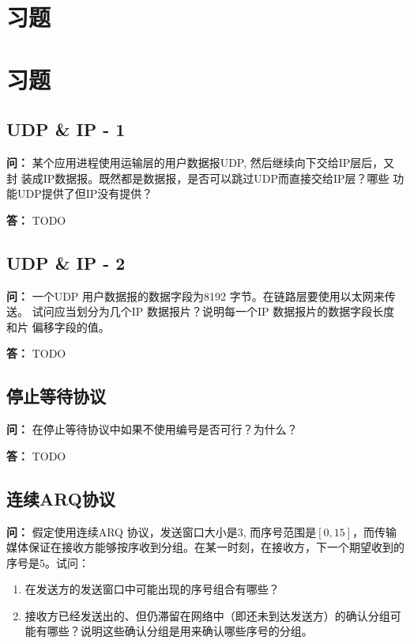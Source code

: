 \documentclass[12pt,hyperref,a4paper,UTF8]{ctexart}
\begin{document}
\cover
\thispagestyle{empty}%


\newpage
\tableofcontents

\newpage
\section{习题}

\section{习题}

\subsection{UDP \& IP - 1}
\textbf{问：}
某个应用进程使用运输层的用户数据报UDP, 然后继续向下交给IP层后，又封
装成IP数据报。既然都是数据报，是否可以跳过UDP而直接交给IP层？哪些
功能UDP提供了但IP没有提供？

\textbf{答：}
TODO

\subsection{UDP \& IP - 2}
\textbf{问：}
一个UDP 用户数据报的数据字段为8192 字节。在链路层要使用以太网来传送。
试问应当划分为几个IP 数据报片？说明每一个IP 数据报片的数据字段长度和片
偏移字段的值。

\textbf{答：}
TODO

\subsection{停止等待协议}
\textbf{问：}
在停止等待协议中如果不使用编号是否可行？为什么？

\textbf{答：}
TODO

\subsection{连续ARQ协议}
\textbf{问：}
假定使用连续ARQ 协议，发送窗口大小是$3$, 而序号范围是$[0, 15]$，而传输媒体保证在接收方能够按序收到分组。在某一时刻，在接收方，下一个期望收到的
序号是$5$。试问：
\begin{enumerate}[label=\Roman*),leftmargin=2.2\parindent]
    \item 在发送方的发送窗口中可能出现的序号组合有哪些？
    \item 接收方已经发送出的、但仍滞留在网络中（即还未到达发送方）的确认分组可能有哪些？说明这些确认分组是用来确认哪些序号的分组。
\end{enumerate}
\end{document}
